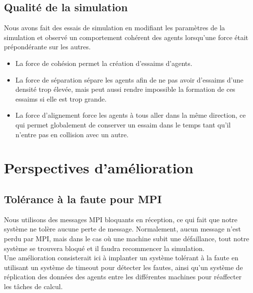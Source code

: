 \documentclass[12pt,a4paper,sans]{article}
\begin{document}
\subsection{Qualité de la simulation}
Nous avons fait des essais de simulation en modifiant les paramètres de la simulation et observé un comportement cohérent des agents lorsqu'une force était prépondérante sur les autres.
\begin{itemize}
    \item La force de cohésion permet la création d'essaims d'agents.
    \item La force de séparation sépare les agents afin de ne pas avoir d'essaims d'une densité trop élevée, mais peut aussi rendre impossible la formation de ces essaims si elle est trop grande.
    \item La force d'alignement force les agents à tous aller dans la même direction, ce qui permet globalement de conserver un essaim dans le temps tant qu'il n'entre pas en collision avec un autre.
\end{itemize}



\section{Perspectives d'amélioration}
\subsection{Tolérance à la faute pour MPI}
Nous utilisons des messages MPI bloquants en réception, ce qui fait que notre système ne tolère aucune perte de message. Normalement, aucun message n'est perdu par MPI, mais dans le cas où une machine subit une défaillance, tout notre système se trouvera bloqué et il faudra recommencer la simulation.\\
Une amélioration consisterait ici à implanter un système tolérant à la faute en utilisant un système de timeout pour détecter les fautes, ainsi qu'un système de réplication des données des agents entre les différentes machines pour réaffecter les tâches de calcul.
\end{document}

